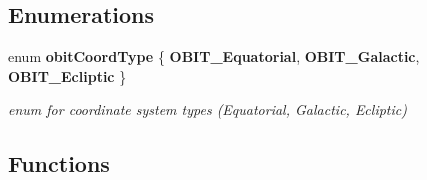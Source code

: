 \subsection*{Enumerations}
\begin{CompactItemize}
\item 
enum {\bf obit\-Coord\-Type} \{ {\bf OBIT\_\-Equatorial}, 
{\bf OBIT\_\-Galactic}, 
{\bf OBIT\_\-Ecliptic}
 \}
\begin{CompactList}\small\item\em enum for coordinate system types (Equatorial, Galactic, Ecliptic) \item\end{CompactList}\end{CompactItemize}
\subsection*{Functions}
